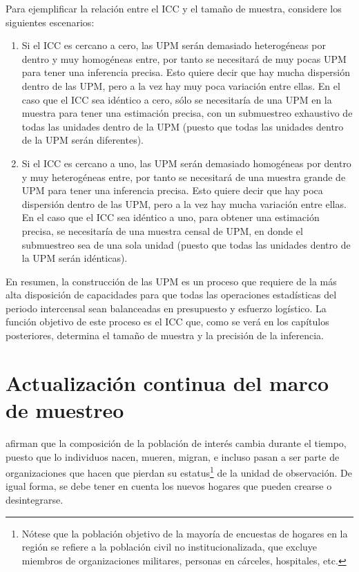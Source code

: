 \documentclass[
  12pt,
  spanish,
]{book}
\begin{document}
Para ejemplificar la relación entre el ICC y el tamaño de muestra, considere los siguientes escenarios:

\begin{enumerate}
\def\labelenumi{\arabic{enumi}.}
\item
  Si el ICC es cercano a cero, las UPM serán demasiado heterogéneas por dentro y muy homogéneas entre, por tanto se necesitará de muy pocas UPM para tener una inferencia precisa. Esto quiere decir que hay mucha dispersión dentro de las UPM, pero a la vez hay muy poca variación entre ellas. En el caso que el ICC sea idéntico a cero, sólo se necesitaría de una UPM en la muestra para tener una estimación precisa, con un submuestreo exhaustivo de todas las unidades dentro de la UPM (puesto que todas las unidades dentro de la UPM serán diferentes).
\item
  Si el ICC es cercano a uno, las UPM serán demasiado homogéneas por dentro y muy heterogéneas entre, por tanto se necesitará de una muestra grande de UPM para tener una inferencia precisa. Esto quiere decir que hay poca dispersión dentro de las UPM, pero a la vez hay mucha variación entre ellas. En el caso que el ICC sea idéntico a uno, para obtener una estimación precisa, se necesitaría de una muestra censal de UPM, en donde el submuestreo sea de una sola unidad (puesto que todas las unidades dentro de la UPM serán idénticas).
\end{enumerate}

En resumen, la construcción de las UPM es un proceso que requiere de la más alta disposición de capacidades para que todas las operaciones estadísticas del periodo intercensal sean balanceadas en presupuesto y esfuerzo logístico. La función objetivo de este proceso es el ICC que, como se verá en los capítulos posteriores, determina el tamaño de muestra y la precisión de la inferencia.

\hypertarget{actualizaciuxf3n-continua-del-marco-de-muestreo}{%
\section{Actualización continua del marco de muestreo}\label{actualizaciuxf3n-continua-del-marco-de-muestreo}}

\citet[pág. 105]{Duncan_Kalton_1987} afirman que la composición de la población de interés cambia durante el tiempo, puesto que lo individuos nacen, mueren, migran, e incluso pasan a ser parte de organizaciones que hacen que pierdan su estatus\footnote{Nótese que la población objetivo de la mayoría de encuestas de hogares en la región se refiere a la población civil no institucionalizada, que excluye miembros de organizaciones militares, personas en cárceles, hospitales, etc.} de la unidad de observación. De igual forma, se debe tener en cuenta los nuevos hogares que pueden crearse o desintegrarse.
\end{document}
